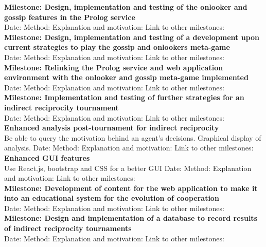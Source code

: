 \documentclass{article}
\begin{document}
\noindent\textbf{Milestone: Design, implementation and testing of the onlooker and gossip features in the Prolog service}\\
Date:
Method: 
Explanation and motivation:
Link to other milestones:\\

\noindent\textbf{Milestone: Design, implementation and testing of a development upon current strategies to play the gossip and onlookers meta-game}\\
Date:
Method: 
Explanation and motivation:
Link to other milestones:\\

\noindent\textbf{Milestone: Relinking the Prolog service and web application environment with the onlooker and gossip meta-game implemented}\\
Date:
Method: 
Explanation and motivation:
Link to other milestones:\\

\noindent\textbf{Milestone: Implementation and testing of further strategies for an indirect reciprocity tournament}\\
Date:
Method: 
Explanation and motivation:
Link to other milestones:\\

\noindent\textbf{Enhanced analysis post-tournament for indirect reciprocity}\\
Be able to query the motivation behind an agent's decisions. Graphical display of analysis.
Date:
Method: 
Explanation and motivation:
Link to other milestones:\\

\noindent\textbf{Enhanced GUI features}\\
Use React.js, bootstrap and CSS for a better GUI
Date:
Method: 
Explanation and motivation:
Link to other milestones:\\

\noindent\textbf{Milestone: Development of content for the web application to make it into an educational system for the evolution of cooperation}\\
Date:
Method: 
Explanation and motivation:
Link to other milestones:\\

\noindent\textbf{Milestone: Design and implementation of a database to record results of indirect reciprocity tournaments}\\
Date:
Method: 
Explanation and motivation:
Link to other milestones:\\
\end{document}
